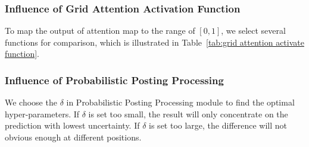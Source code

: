 \documentclass[journal]{IEEEtran}
\begin{document}
	\subsubsection{Influence of Grid Attention Activation Function}
	To map the output of attention map to the range of $[0, 1]$, we select several functions for comparison, which is illustrated in Table~\ref{tab:grid attention activate function}. 
	
	\subsubsection{Influence of Probabilistic Posting Processing}
	We choose the $\delta$ in Probabilistic Posting Processing module to find the optimal hyper-parameters. If $\delta$ is set too small, the result will only concentrate on the prediction with lowest uncertainty. If $\delta$ is set too large, the difference will not obvious enough at different positions.

	

	
	
\end{document}
